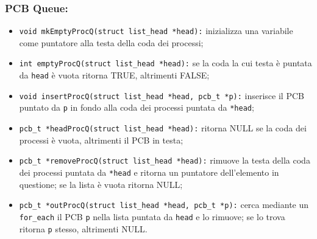 \documentclass{article}
\begin{document}
\subsubsection{PCB Queue:}
\begin{itemize}
    \item \texttt{void mkEmptyProcQ(struct list\_head *head):} inizializza una variabile come puntatore alla testa della coda dei processi;
    \item \texttt{int emptyProcQ(struct list\_head *head):} se la coda la cui testa è puntata da \texttt{head} è vuota ritorna TRUE, altrimenti FALSE;
    \item \texttt{void insertProcQ(struct list\_head *head, pcb\_t *p):} inserisce il PCB puntato da \texttt{p} in fondo alla coda dei processi puntata da \texttt{*head};
    \item \texttt{pcb\_t *headProcQ(struct list\_head *head):} ritorna NULL se la coda dei processi è vuota, altrimenti il PCB in testa;
    \item \texttt{pcb\_t *removeProcQ(struct list\_head *head):} rimuove la testa della coda dei processi puntata da \texttt{*head} e ritorna un puntatore dell'elemento in questione; se la lista è vuota ritorna NULL;
    \item \texttt{pcb\_t *outProcQ(struct list\_head *head, pcb\_t *p):} cerca mediante un \texttt{for\_each} il PCB \texttt{p} nella lista puntata da \texttt{head} e lo rimuove; se lo trova ritorna \texttt{p} stesso, altrimenti NULL.
\end{itemize}
\newpage
\end{document}
